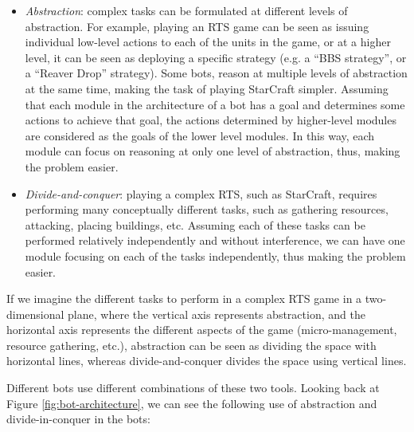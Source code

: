 \documentclass[journal]{IEEEtran}
\begin{document}
\begin{itemize}
\item {\em Abstraction}: complex tasks can be formulated at different levels of abstraction. For example, playing an RTS game can be seen as issuing individual low-level actions to each of the units in the game, or at a higher level, it can be seen as deploying a specific strategy (e.g. a ``BBS strategy'', or a ``Reaver Drop'' strategy). Some bots, reason at multiple levels of abstraction at the same time, making the task of playing StarCraft simpler. Assuming that each module in the architecture of a bot has a goal and determines some actions to achieve that goal, the actions determined by higher-level modules are considered as the goals of the lower level modules. In this way, each module can focus on reasoning at only one level of abstraction, thus, making the problem easier.

\item {\em Divide-and-conquer}: playing a complex RTS, such as StarCraft, requires performing many conceptually different tasks, such as gathering resources, attacking, placing buildings, etc. Assuming each of these tasks can be performed relatively independently and without interference, we can have one module focusing on each of the tasks independently, thus making the problem easier. 
\end{itemize}

If we imagine the different tasks to perform in a complex RTS game in a two-dimensional plane, where the vertical axis represents abstraction, and the horizontal axis represents the different aspects of the game (micro-management, resource gathering, etc.), abstraction can be seen as dividing the space with horizontal lines, whereas divide-and-conquer divides the space using vertical lines.

Different bots use different combinations of these two tools. Looking back at Figure \ref{fig:bot-architecture}, we can see the following use of abstraction and divide-in-conquer in the bots:
\end{document}
